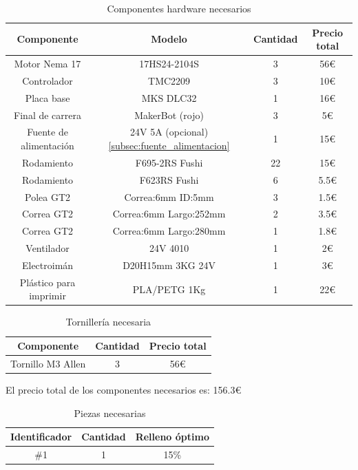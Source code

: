 \begin{table}[H]
\begin{center}
\begin{tabular}{|c|c|c|c|}
\hline
\textbf{Componente} & \textbf{Modelo} & \textbf{Cantidad} & \textbf{Precio total} \\
\hline
Motor Nema 17 & 17HS24-2104S & 3 & 56\euro \\
Controlador & TMC2209 & 3 & 10\euro \\
Placa base & MKS DLC32 & 1 & 16\euro \\
Final de carrera & MakerBot (rojo) & 3 & 5\euro \\
Fuente de alimentación & 24V 5A (opcional)\ref{subsec:fuente_alimentacion} & 1 & 15\euro \\
Rodamiento &  F695-2RS Fushi & 22 & 15\euro \\
Rodamiento & F623RS Fushi & 6 & 5.5\euro \\
Polea GT2 & Correa:6mm ID:5mm & 3 & 1.5\euro \\
Correa GT2 & Correa:6mm Largo:252mm & 2 & 3.5\euro \\ 
Correa GT2 &  Correa:6mm Largo:280mm & 1 & 1.8\euro \\ 
Ventilador & 24V 4010 & 1 & 2\euro \\
Electroimán & D20H15mm 3KG 24V & 1 & 3\euro \\
Plástico para imprimir & PLA/PETG 1Kg & 1 & 22\euro \\
\hline
\end{tabular}
\caption{Componentes hardware necesarios}
\label{cuadro:componentes}
\end{center}
\end{table}

\begin{table}[H]
\begin{center}
\begin{tabular}{|c|c|c|}
\hline
\textbf{Componente} & \textbf{Cantidad} & \textbf{Precio total} \\
\hline
Tornillo M3 Allen & 3 & 56\euro \\

\hline
\end{tabular}
\caption{Tornillería necesaria}
\label{cuadro:tornilleria}
\end{center}
\end{table}

El precio total de los componentes necesarios es: 156.3\euro
\begin{table}[H]
\begin{center}
\begin{tabular}{|c|c|c|}
\hline
\textbf{Identificador} & \textbf{Cantidad} & \textbf{Relleno óptimo} \\
\hline
\#1 & 1 & 15\% \\
\hline
\end{tabular}
\caption{Piezas necesarias}
\label{cuadro:piezas}
\end{center}
\end{table}

